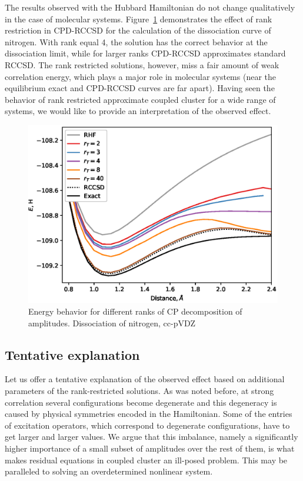 The results observed with the Hubbard Hamiltonian do not change qualitatively 
in the case of molecular systems. Figure~\ref{fig:energy_vs_d_cc-pvdz} 
demonstrates the effect of rank restriction in CPD-RCCSD for the calculation of 
the dissociation curve of nitrogen. With rank equal 4, the solution has the 
correct behavior at the dissociation limit, while for larger ranks CPD-RCCSD 
approximates standard RCCSD. The rank restricted solutions, however, miss a 
fair amount of weak correlation energy, which plays a major role in molecular 
systems (near the equilibrium exact and 
CPD-RCCSD curves are far apart). Having seen the behavior of rank restricted 
approximate coupled cluster for a wide range of systems, we would like to 
provide an interpretation of the observed effect.
%
\begin{figure}[!ht]
\centering
\includegraphics[width=\columnwidth]
{figures/tcc_strong_correlation/energy_vs_d_cc-pvdz}
\caption{Energy behavior for different ranks of CP decomposition of 
amplitudes. Dissociation of nitrogen, cc-pVDZ}
\label{fig:energy_vs_d_cc-pvdz}
\end{figure}
%

\subsection{Tentative explanation}
Let us offer a tentative explanation of the observed effect based on additional 
parameters of the rank-restricted solutions. As was noted before, at strong 
correlation several configurations become degenerate and this degeneracy 
is caused by physical symmetries encoded in the 
Hamiltonian.\cite{scuseria2011projected,jimenez2012projected} Some of the 
entries of excitation operators, which correspond to degenerate configurations, 
have to get larger and larger values. We argue that this imbalance, namely a 
significantly higher importance of a small subset of amplitudes over the rest of 
them, is what makes residual equations in coupled cluster an ill-posed problem. 
This may be paralleled to solving an overdetermined nonlinear system.


